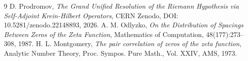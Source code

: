 \documentclass[11pt,a4paper]{article}
\theoremstyle{definition}
\begin{document}
\begin{thebibliography}{9}
 D. Prodromov, \emph{The Grand Unified Resolution of the Riemann Hypothesis via Self-Adjoint Krein-Hilbert Operators}, CERN Zenodo, DOI: 10.5281/zenodo.22148893, 2026.
 A. M. Odlyzko, \emph{On the Distribution of Spacings Between Zeros of the Zeta Function}, Mathematics of Computation, 48(177):273--308, 1987.
 H. L. Montgomery, \emph{The pair correlation of zeros of the zeta function}, Analytic Number Theory, Proc. Sympos. Pure Math., Vol. XXIV, AMS, 1973.
\end{thebibliography}
\end{document}

